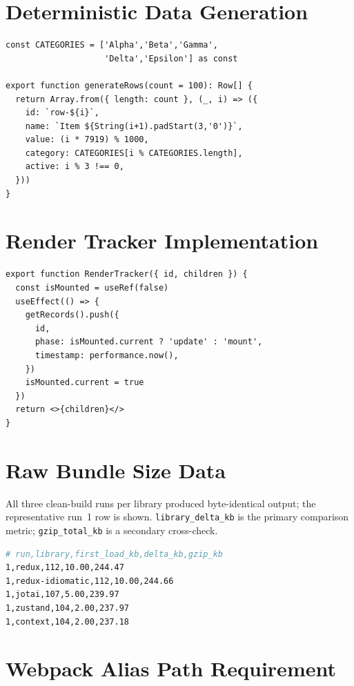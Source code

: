 \documentclass[conference]{IEEEtran}
\newcommand{\code}[1]{\texttt{\small #1}}
\begin{document}
\appendices

\section{Deterministic Data Generation}
\label{app:seed}

\begin{lstlisting}
const CATEGORIES = ['Alpha','Beta','Gamma',
                    'Delta','Epsilon'] as const

export function generateRows(count = 100): Row[] {
  return Array.from({ length: count }, (_, i) => ({
    id: `row-${i}`,
    name: `Item ${String(i+1).padStart(3,'0')}`,
    value: (i * 7919) % 1000,
    category: CATEGORIES[i % CATEGORIES.length],
    active: i % 3 !== 0,
  }))
}
\end{lstlisting}

\section{Render Tracker Implementation}
\label{app:tracker}

\begin{lstlisting}
export function RenderTracker({ id, children }) {
  const isMounted = useRef(false)
  useEffect(() => {
    getRecords().push({
      id,
      phase: isMounted.current ? 'update' : 'mount',
      timestamp: performance.now(),
    })
    isMounted.current = true
  })
  return <>{children}</>
}
\end{lstlisting}

\section{Raw Bundle Size Data}
\label{app:bundle}

All three clean-build runs per library produced byte-identical output;
the representative run~1 row is shown. \code{library\_delta\_kb} is the
primary comparison metric; \code{gzip\_total\_kb} is a secondary cross-check.

\begin{lstlisting}[language=bash]
# run,library,first_load_kb,delta_kb,gzip_kb
1,redux,112,10.00,244.47
1,redux-idiomatic,112,10.00,244.66
1,jotai,107,5.00,239.97
1,zustand,104,2.00,237.97
1,context,104,2.00,237.18
\end{lstlisting}

\section{Webpack Alias Path Requirement}
\label{app:webpack}
\end{document}
